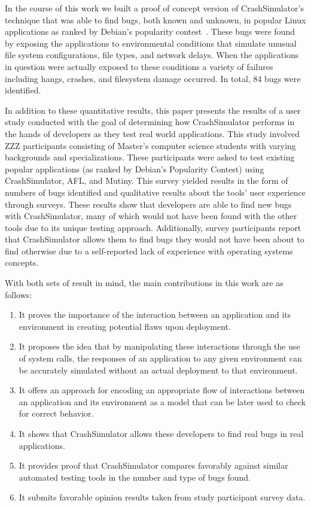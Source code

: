 In the course of this work we built a proof of concept version of
CrashSimulator's technique that was able to find bugs, both known and
unknown, in popular Linux applications as ranked by Debian's popularity
contest~\cite{DebPopCon}.  These bugs were found by exposing the
applications to environmental conditions that simulate unusual file system
configurations, file types, and network delays.  When the applications in
question were actually exposed to these conditions a variety of failures
including hangs, crashes, and filesystem damage occurred.  In total, 84
bugs were identified.

In addition to these quantitative results, this paper presents the results
of a user study conducted with the goal of determining how CrashSimulator
performs in the hands of developers as they test real world applications.
This study involved ZZZ participants consisting of Master's computer
science students with varying backgrounds and specializations.  These
participants were asked to test existing popular applications (as ranked by
Debian's Popularity Contest) using CrashSimulator, AFL, and Mutiny.  This
survey yielded results in the form of numbers of bugs identified and
qualitative results about the tools' user experience through surveys.
These results show that developers are able to find new bugs with
CrashSimulator, many of which would not have been found with the other
tools due to its unique testing approach.  Additionally, survey
participants report that CrashSimulator allows them to find bugs they would
not have been about to find otherwise due to a self-reported lack of
experience with operating systems concepts.

With both sets of result in mind, the main contributions in this work are
as follows:

\begin{enumerate}

\item{It proves the importance of the interaction between an application
and its environment in creating potential flaws upon deployment.}

\item{It proposes the idea that by manipulating these interactions through
the use of system calls, the responses of an application to any given
environment can be accurately simulated without an actual
deployment to that environment.}

\item{It offers an approach for encoding an appropriate flow of
interactions between an application and its environment as a model that
can be later used to check for correct behavior.}

\item{It shows that CrashSimulator allows these developers to find real
bugs in real applications.}

\item{It provides proof that CrashSimulator compares favorably against
similar automated testing tools in the number and type of bugs found.}

\item{It submits favorable opinion results taken from study participant
survey data.}

\end{enumerate}
